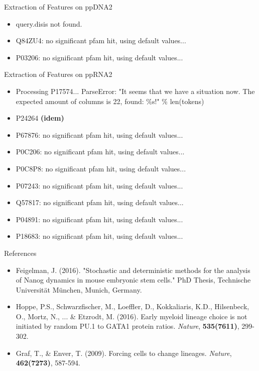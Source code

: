 \documentclass[pdf]
{beamer}
\begin{document}
\begin{frame}{Extraction of Features on ppDNA2}
	\begin{itemize}
		\item query.disis not found.
		\item Q84ZU4: no significant pfam hit, using default values...
		\item P03206: no significant pfam hit, using default values...
	\end{itemize}
\end{frame}

\begin{frame}{Extraction of Features on ppRNA2}
	\begin{itemize}
		\item Processing P17574... ParseError: "It seems that we have a situation now. The expected amount of columns is 22, found: \%s!" \% len(tokens)\\
		\item P24264 \textbf{(idem)}\\
		\item P67876: no significant pfam hit, using default values...
		\item P0C206: no significant pfam hit, using default values...
		\item P0C8P8: no significant pfam hit, using default values...
		\item P07243: no significant pfam hit, using default values...
		\item Q57817: no significant pfam hit, using default values...
		\item P04891: no significant pfam hit, using default values...
		\item P18683: no significant pfam hit, using default values...
	\end{itemize}
\end{frame}



\begin{frame}{References}

	\begin{itemize}
		\item Feigelman, J. (2016). "Stochastic and deterministic methods for the analysis of Nanog dynamics in mouse embryonic stem cells." PhD Thesis, Technische Universit\"at M\"unchen, Munich, Germany.
		\item Hoppe, P.S., Schwarzfischer, M., Loeffler, D.,  Kokkaliaris, K.D., Hilsenbeck, O., Mortz, N., ... \& Etzrodt, M. (2016). Early myeloid lineage choice is not initiated by random PU.1 to GATA1 protein ratios. \textit{Nature}, \textbf{535(7611)}, 299-302.
		\item Graf, T., \& Enver, T. (2009). Forcing cells to change lineages. \textit{Nature}, \textbf{462(7273)}, 587-594.
	\end{itemize}
\end{frame}
\end{document}
